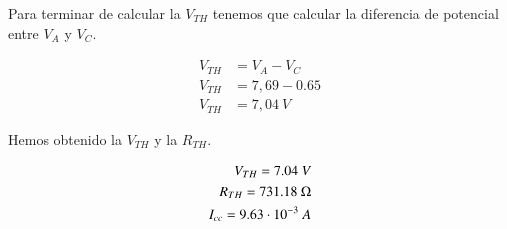 {       %

       Para terminar de calcular la $V_{TH}$
       tenemos que calcular la diferencia de
       potencial entre $V_A$ y $V_C$.

       \begin{equation}
         \begin{split}
           V_{TH}&=V_A-V_C\\
           V_{TH}&=7,69 - 0.65\\
           V_{TH} &= 7,04 \ V
           \end{split}
       \end{equation} 

      \item Hemos obtenido la $V_{TH}$ y la
        $R_{TH}$.

        \begin{equation}
          \begin{split}
            V_{TH} = 7.04 \ V\\
            R_{TH} = 731.18 \ \Omega\\
            I_{cc} = 9.63 \cdot 10^{-3} \ A
            \end{split}
          \end{equation}
}


